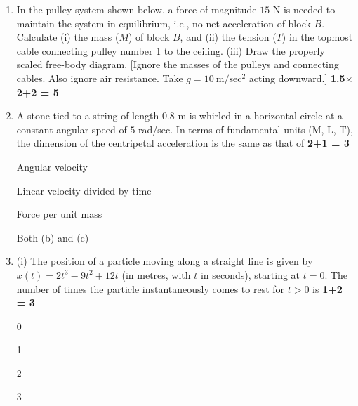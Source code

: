 \documentclass[11pt]{article}
\newcommand{\opt}[2]{%
  \begin{minipage}[t]{0.9\linewidth}
    \fbox{\textbf{#1}}\hspace{0.5em}#2
  \end{minipage}\par\vspace{2pt}
}
\begin{document}
\begin{enumerate}[leftmargin=1.6em, label=\arabic*., itemsep=14pt]
\item In the pulley system shown below, a force of magnitude $15$ N is needed to maintain the system in equilibrium, i.e., no net acceleration of block $B$. Calculate (i) the mass ($M$) of block $B$, and (ii) the tension ($T$) in the topmost cable connecting pulley number 1 to the ceiling. (iii) Draw the properly scaled free-body diagram. [Ignore the masses of the pulleys and connecting cables. Also ignore air resistance. Take $g = 10\ \mathrm{m/sec^2}$ acting downward.] \hfill \textbf{1.5$\times$2+2 = 5}

\begin{center}
\end{center}

\item A stone tied to a string of length $0.8$ m is whirled in a horizontal circle at a constant angular speed of $5$ rad/sec. In terms of fundamental units (M, L, T), the dimension of the centripetal acceleration is the same as that of \hfill \textbf{2+1 = 3}
\opt{a}{Angular velocity}
\opt{b}{Linear velocity divided by time}
\opt{c}{Force per unit mass}
\opt{d}{Both (b) and (c)}

\item (i) The position of a particle moving along a straight line is given by $x(t) = 2t^3 - 9t^2 + 12t$ (in metres, with $t$ in seconds), starting at $t=0$. The number of times the particle instantaneously comes to rest for $t > 0$ is \hfill \textbf{1+2 = 3}
\opt{a}{0}
\opt{b}{1}
\opt{c}{2}
\opt{d}{3}


\end{enumerate}
\end{document}
